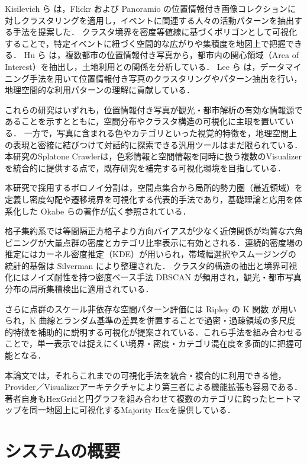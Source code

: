 Kisilevich ら\cite{kisilevich2010eventbased} は，Flickr および Panoramio の位置情報付き画像コレクションに対しクラスタリングを適用し，イベントに関連する人々の活動パターンを抽出する手法を提案した．
クラスタ境界を密度等値線に基づくポリゴンとして可視化することで，特定イベントに紐づく空間的な広がりや集積度を地図上で把握できる．
Hu ら\cite{hu2015extractingAOI} は，複数都市の位置情報付き写真から，都市内の関心領域（Area of Interest）を抽出し，土地利用との関係を分析している．
Lee ら\cite{lee2014exploration} は，データマイニング手法を用いて位置情報付き写真のクラスタリングやパターン抽出を行い，地理空間的な利用パターンの理解に貢献している．

これらの研究はいずれも，位置情報付き写真が観光・都市解析の有効な情報源であることを示すとともに，空間分布やクラスタ構造の可視化に主眼を置いている．
一方で，写真に含まれる色やカテゴリといった視覚的特徴を，地理空間上の表現と密接に結びつけて対話的に探索できる汎用ツールはまだ限られている．
本研究のSplatone Crawlerは，色彩情報と空間情報を同時に扱う複数のVisualizerを統合的に提供する点で，既存研究を補完する可視化環境を目指している．

本研究で採用するボロノイ分割は，空間点集合から局所的勢力圏（最近領域）を定義し密度勾配や遷移境界を可視化する代表的手法であり，基礎理論と応用を体系化した Okabe らの著作\cite{okabe2000spatial}が広く参照されている．

格子集約系では等間隔正方格子より方向バイアスが少なく近傍関係が均質な六角ビニング\cite{carr1987hexbin}が大量点群の密度とカテゴリ比率表示に有効とされる．連続的密度場の推定にはカーネル密度推定（KDE）が用いられ，帯域幅選択やスムージングの統計的基盤は Silverman\cite{silverman1986density} により整理された．
クラスタ的構造の抽出と境界可視化にはノイズ耐性を持つ密度ベース手法 DBSCAN\cite{ester1996dbscan} が頻用され，観光・都市写真分布の局所集積検出に適用されている．

さらに点群のスケール非依存な空間パターン評価には Ripley の K 関数\cite{ripley1976second} が用いられ，K 曲線とランダム基準の差異を併置することで過密・過疎領域の多尺度的特徴を補助的に説明する可視化が提案されている．これら手法を組み合わせることで，単一表示では捉えにくい境界・密度・カテゴリ混在度を多面的に把握可能となる．

本論文では，それらこれまでの可視化手法を統合・複合的に利用できる他，Provider／Visualizerアーキテクチャにより第三者による機能拡張も容易である．著者自身もHexGridと円グラフを組み合わせて複数のカテゴリに跨ったヒートマップを同一地図上に可視化するMajority Hexを提供している．
\section{システムの概要}
\label{sec:overview}

